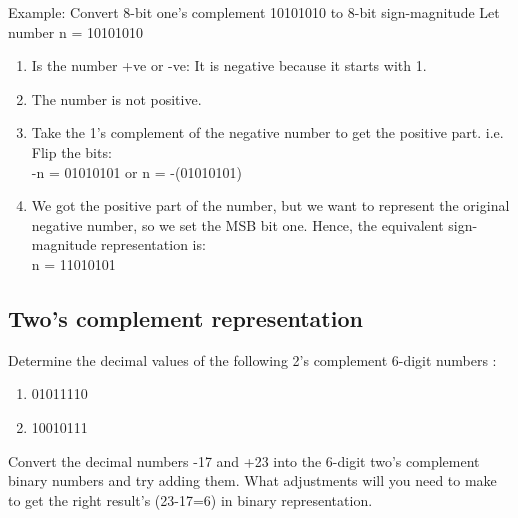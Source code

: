 Example: Convert 8-bit one's complement 10101010 to 8-bit sign-magnitude
Let number n = 10101010
\begin{enumerate}
\item Is the number +ve or -ve: It is negative because it starts with 1.
\item The number is not positive.
\item Take the 1's complement of the negative number to get the positive part. i.e. Flip the bits:\\
-n = 01010101 or n = -(01010101)
\item
 We got the positive part of the number, but we want to represent the original negative number, so we set the MSB bit one. Hence, the equivalent sign-magnitude representation is:\\
n = 11010101
\end{enumerate}


\subsection{Two's complement representation}

\vspace{20em}

\begin{prob}
  Determine the decimal values of the following 2’s complement 6-digit numbers :
  \begin{enumerate}
  \item 01011110
  \item 10010111
  \end{enumerate}
\end{prob}
\vspace{10em}

\begin{prob}
  Convert the decimal numbers -17 and +23 into the 6-digit two's complement binary numbers and try adding them. What adjustments will you need to make to get the right result's (23-17=6) in binary representation.
\end{prob}
\vspace{20em}

